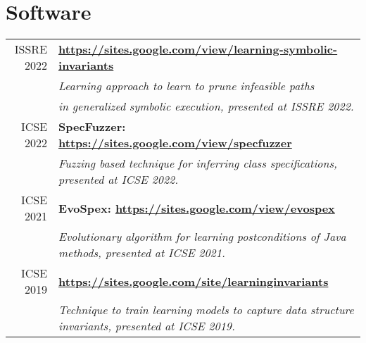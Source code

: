 \documentclass[a4paper,10pt]{article} %
\begin{document}
\section{Software}
\begin{longtable}{rl}
\textsc{ISSRE 2022} & \textbf{\url{https://sites.google.com/view/learning-symbolic-invariants}} \\
& \textit{Learning approach to learn to prune infeasible paths} \\
& \textit{in generalized symbolic execution, presented at ISSRE 2022.} \\

\textsc{ICSE 2022} & \textbf{SpecFuzzer: \url{https://sites.google.com/view/specfuzzer}} \\
& \textit{Fuzzing based technique for inferring class specifications, presented at ICSE 2022.} \\

\textsc{ICSE 2021} & \textbf{EvoSpex: \url{https://sites.google.com/view/evospex}} \\
& \textit{Evolutionary algorithm for learning postconditions of Java methods, presented at ICSE 2021.} \\

\textsc{ICSE 2019} & \textbf{\url{https://sites.google.com/site/learninginvariants}} \\
& \textit{Technique to train learning models to capture data structure invariants, presented at ICSE 2019.} \\

\end{longtable}
\end{document}
